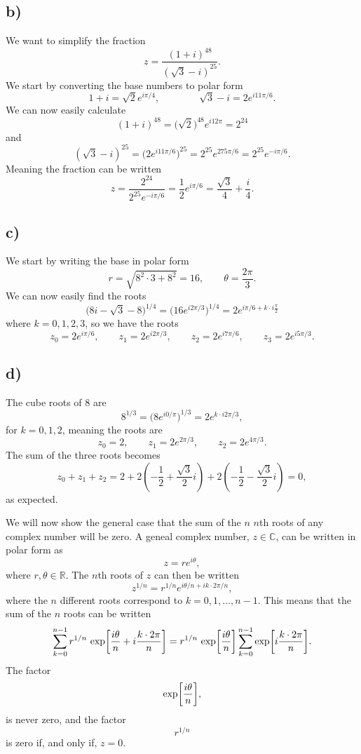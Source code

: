\documentclass[a4paper, 11pt, titlepage, english]{article}
\begin{document}
\subsection*{b)}
We want to simplify the fraction
$$z = \frac{(1+i)^{48}}{(\sqrt{3}-i)^{25}}.$$
We start by converting the base numbers to polar form
$$1+i = \sqrt{2}e^{i \pi/4}, \qquad \qquad \sqrt{3}-i = 2e^{i11\pi/6}.$$
We can now easily calculate
$$(1+i)^{48} = \big(\sqrt{2}\big)^{48} e^{i 12\pi} = 2^{24}$$
and
$$(\sqrt{3}-i)^{25} = \big(2e^{i 11\pi/6}\big)^{25} = 2^{25}e^{275\pi/6} = 2^{25}e^{-i\pi/6}.$$
Meaning the fraction can be written
$$z = \frac{2^{24}}{2^{25}e^{-i\pi/6}} = \frac{1}{2}e^{i\pi/6} = \frac{\sqrt{3}}{4} + \frac{i}{4}.$$

\subsection*{c)}
We start by writing the base in polar form
$$r = \sqrt{8^2\cdot 3 + 8^2} = 16, \qquad \theta = \frac{2\pi}{3}.$$
We can now easily find the roots
$$\bigg(8i-\sqrt{3}-8)^{1/4} = \bigg(16e^{i2\pi/3}\bigg)^{1/4} = 2 e^{i\pi/6 + k\cdot i\frac{\pi}{2}}$$
where $k=0,1,2,3$, so we have the roots
$$z_0 = 2e^{i\pi/6}, \qquad z_1 = 2e^{i2\pi/3}, \qquad z_2 = 2e^{i7\pi/6}, \qquad z_3 = 2e^{i 5\pi/3}.$$ 

\clearpage
\subsection*{d)}
The cube roots of 8 are
$$8^{1/3} = \bigg(8e^{i 0/\pi}\bigg)^{1/3} = 2e^{k\cdot i2\pi/3},$$
for $k=0,1,2$, meaning the roots are
$$z_0 = 2, \qquad z_1 = 2e^{2\pi/3}, \qquad z_2 = 2e^{4\pi/3}.$$
The sum of the three roots becomes
$$z_0 + z_1 + z_2 = 2 + 2\left(-\frac{1}{2} + \frac{\sqrt{3}}{2}i\right) + 2\left(-\frac{1}{2} - \frac{\sqrt{3}}{2}i\right) = 0,$$ 
as expected.

We will now show the general case that the sum of the $n$ $n$th roots of any complex number will be zero. A geneal complex number,  $z \in \mathbb{C}$, can be written in polar form as
$$z = re^{i\theta},$$
where $r, \theta \in \mathbb{R}$. The $n$th roots of $z$ can then be written
$$z^{1/n} = r^{1/n} e^{i\theta/n + ik\cdot2\pi/n},$$
where the $n$ different roots correspond to $k=0,1,\ldots,n-1$. This means that the sum of the $n$ roots can be written
$$\sum_{k=0}^{n-1} r^{1/n}\ {\rm exp}\bigg[\frac{i\theta}{n} + i\frac{k\cdot2\pi}{n}\bigg] = r^{1/n}\ {\rm exp}\bigg[\frac{i\theta}{n}\bigg] \sum_{k=0}^{n-1}  {\rm exp}\bigg[i\frac{k\cdot2\pi}{n}\bigg].$$
The factor 
$$ {\rm exp}\bigg[\frac{i\theta}{n}\bigg],$$
is never zero, and the factor
$$ r^{1/n}$$
is zero if, and only if, $z = 0$. 
\end{document}
